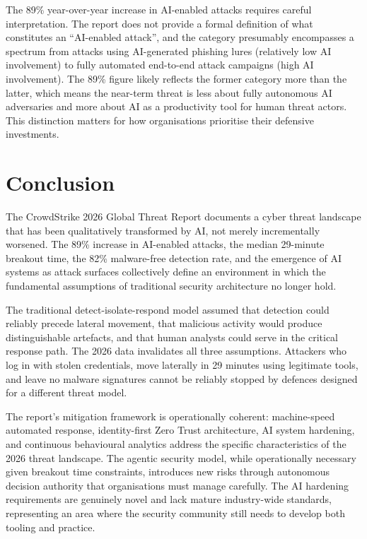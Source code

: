 \documentclass[journal]{IEEEtran}
\begin{document}
The 89\% year-over-year increase in AI-enabled attacks requires careful interpretation.
The report does not provide a formal definition of what constitutes an
``AI-enabled attack'', and the category presumably encompasses a spectrum from
attacks using AI-generated phishing lures (relatively low AI involvement) to fully
automated end-to-end attack campaigns (high AI involvement). The 89\% figure likely
reflects the former category more than the latter, which means the near-term threat
is less about fully autonomous AI adversaries and more about AI as a productivity
tool for human threat actors. This distinction matters for how organisations
prioritise their defensive investments.

\section{Conclusion}

The CrowdStrike 2026 Global Threat Report documents a cyber threat landscape that
has been qualitatively transformed by AI, not merely incrementally worsened. The
89\% increase in AI-enabled attacks, the median 29-minute breakout time, the 82\%
malware-free detection rate, and the emergence of AI systems as attack surfaces
collectively define an environment in which the fundamental assumptions of
traditional security architecture no longer hold.

The traditional detect-isolate-respond model assumed that detection could reliably
precede lateral movement, that malicious activity would produce distinguishable
artefacts, and that human analysts could serve in the critical response path. The
2026 data invalidates all three assumptions. Attackers who log in with stolen
credentials, move laterally in 29 minutes using legitimate tools, and leave no
malware signatures cannot be reliably stopped by defences designed for a different
threat model.

The report's mitigation framework is operationally coherent: machine-speed automated
response, identity-first Zero Trust architecture, AI system hardening, and continuous
behavioural analytics address the specific characteristics of the 2026 threat
landscape. The agentic security model, while operationally necessary given breakout
time constraints, introduces new risks through autonomous decision authority that
organisations must manage carefully. The AI hardening requirements are genuinely
novel and lack mature industry-wide standards, representing an area where the
security community still needs to develop both tooling and practice.
\end{document}
